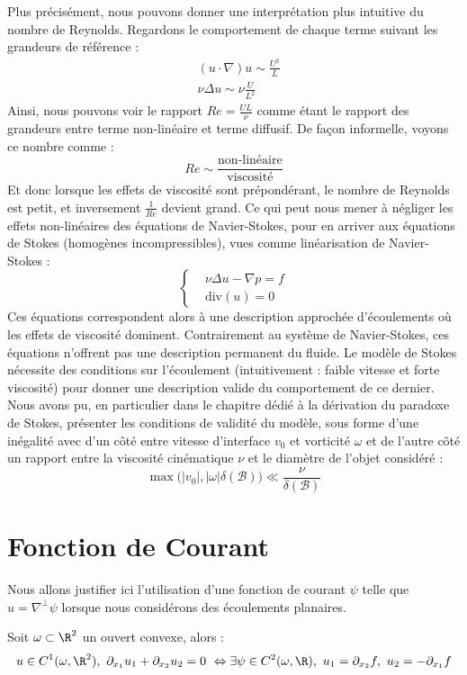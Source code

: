 Plus précisément, nous pouvons donner une interprétation plus intuitive du nombre de Reynolds. Regardons le comportement de chaque terme suivant les grandeurs de référence :
\begin{align*}
    &(u \cdot \nabla )u \sim \frac{U^2}{L} \\
    &\nu \Delta u \sim \nu \frac{U}{L^2}
\end{align*}
Ainsi, nous pouvons voir le rapport $Re = \frac{UL}{\nu}$ comme étant le rapport des grandeurs entre terme non-linéaire et terme diffusif. De façon informelle, voyons ce nombre comme :
$$ Re \sim \frac{\text{non-linéaire}}{\text{viscosité}} $$
Et donc lorsque les effets de viscosité sont prépondérant, le nombre de Reynolds est petit, et inversement $\frac{1}{Re}$ devient grand. Ce qui peut nous mener à négliger les effets non-linéaires des équations de Navier-Stokes, pour en arriver aux équations de Stokes (homogènes incompressibles), vues comme linéarisation de Navier-Stokes :
$$\begin{cases}
    &\nu \Delta u - \nabla p = f \\
    &\text{div}(u) = 0
\end{cases}$$
Ces équations correspondent alors à une description approchée d'écoulements où les effets de viscosité dominent. Contrairement au système de Navier-Stokes, ces équations n'offrent pas une description permanent du fluide. Le modèle de Stokes nécessite des conditions sur l'écoulement (intuitivement : faible vitesse et forte viscosité) pour donner une description valide du comportement de ce dernier.
Nous avons pu, en particulier dans le chapitre dédié à la dérivation du paradoxe de Stokes, présenter les conditions de validité du modèle, sous forme d'une inégalité avec d'un côté entre vitesse d'interface $v_0$ et vorticité $\omega$ et de l'autre côté un rapport entre la viscosité cinématique $\nu$ et le diamètre de l'objet considéré :
$$ \max\Big(|v_0|,|\omega|\delta(\mathscr{B})\Big) \ll \frac{\nu}{\delta(\mathscr{B})} $$





\section{Fonction de Courant}

Nous allons justifier ici l'utilisation d'une fonction de courant $\psi$ telle que $u = \nabla^{\perp}\psi$ lorsque nous considérons des écoulements planaires.

\begin{lemmabox}
\begin{lemma}
    Soit $\omega \subset \R^2$ un ouvert convexe, alors :
    $$ u\in C^1(\omega,\R^2), \ \partial_{x_1}u_1 + \partial_{x_2}u_2 = 0 \ \Leftrightarrow \exists \psi \in C^2(\omega,\R), \ u_1 = \partial_{x_2}f, \ u_2 = -\partial_{x_1}f $$
\end{lemma}
\end{lemmabox}


